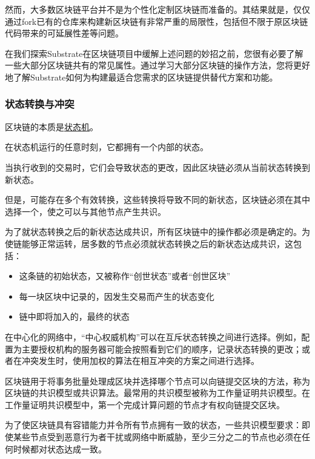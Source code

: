然而，大多数区块链平台并不是为个性化定制区块链而准备的。其结果就是，仅仅通过fork已有的仓库来构建新区块链有非常严重的局限性，包括但不限于原区块链代码带来的可延展性差等问题。

在我们探索Substrate在区块链项目中缓解上述问题的妙招之前，您很有必要了解一些大部分区块链共有的常见属性。通过学习大部分区块链的操作方法，您将更好地了解Substrate如何为构建最适合您需求的区块链提供替代方案和功能。

\hypertarget{ux72b6ux6001ux8f6cux6362ux4e0eux51b2ux7a81}{%
\subsubsection{状态转换与冲突}\label{ux72b6ux6001ux8f6cux6362ux4e0eux51b2ux7a81}}

区块链的本质是\href{(https://en.wikipedia.org/wiki/Finite-state_machine)}{状态机}。

在状态机运行的任意时刻，它都拥有一个内部的状态。

当执行收到的交易时，它们会导致状态的更改，因此区块链必须从当前状态转换到新状态。

但是，可能存在多个有效转换，这些转换将导致不同的新状态，区块链必须在其中选择一个，使之可以与其他节点产生共识。

为了就状态转换之后的新状态达成共识，所有区块链中的操作都必须是确定的。为使链能够正常运转，居多数的节点必须就状态转换之后的新状态达成共识，这包括：

\begin{itemize}
\item
  这条链的初始状态，又被称作``创世状态''或者``创世区块''
\item
  每一块区块中记录的，因发生交易而产生的状态变化
\item
  链中即将加入的，最终的状态
\end{itemize}

在中心化的网络中，``中心权威机构''可以在互斥状态转换之间进行选择。例如，配置为主要授权机构的服务器可能会按照看到它们的顺序，记录状态转换的更改；或者在冲突发生时，使用加权的算法在相互冲突的方案之间进行选择。

区块链用于将事务批量处理成区块并选择哪个节点可以向链提交区块的方法，称为区块链的共识模型或共识算法。最常用的共识模型被称为工作量证明共识模型。在工作量证明共识模型中，第一个完成计算问题的节点才有权向链提交区块。

为了使区块链具有容错能力并令所有节点拥有一致的状态，一些共识模型要求：即使某些节点受到恶意行为者干扰或网络中断威胁，至少三分之二的节点也必须在任何时候都对状态达成一致。

